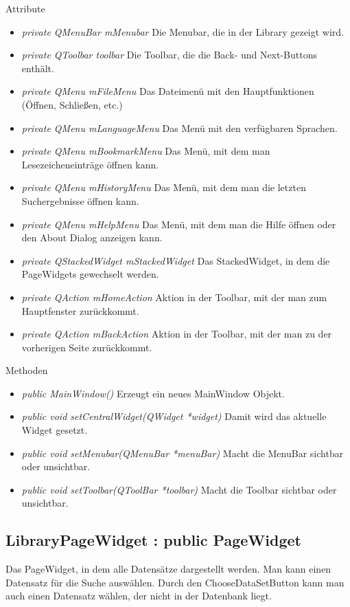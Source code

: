 Attribute
\begin{itemize}
	\item\textit{private QMenuBar mMenubar}
	Die Menubar, die in der Library gezeigt wird.   
	\item\textit{private QToolbar toolbar}
	Die Toolbar, die die Back- und Next-Buttons enthält.
	\item\textit{private QMenu mFileMenu}
	Das Dateimenü mit den Hauptfunktionen (Öffnen, Schließen, etc.)
	\item\textit{private QMenu mLanguageMenu}
	Das Menü mit den verfügbaren Sprachen.
	\item\textit{private QMenu mBookmarkMenu}
	Das Menü, mit dem man Lesezeicheneinträge öffnen kann.
	\item\textit{private QMenu mHistoryMenu}
	Das Menü, mit dem man die letzten Suchergebnisse öffnen kann.
	\item\textit{private QMenu mHelpMenu}
	Das Menü, mit dem man die Hilfe öffnen oder den About Dialog anzeigen kann.
	\item\textit{private QStackedWidget mStackedWidget}
	Das StackedWidget, in dem die PageWidgets gewechselt werden.
	\item\textit{private QAction mHomeAction}
	Aktion in der Toolbar, mit der man zum Hauptfenster zurückkommt.
	\item\textit{private QAction mBackAction}
	Aktion in der Toolbar, mit der man zu der vorherigen Seite zurückkommt.
\end{itemize}

Methoden
\begin{itemize}
	\item\textit{public MainWindow()} 
	Erzeugt ein neues MainWindow Objekt.
	\item\textit{public void setCentralWidget(QWidget *widget)} 
	Damit wird das aktuelle Widget gesetzt.
	\item\textit{public void setMenubar(QMenuBar *menuBar)} 
	Macht die MenuBar sichtbar oder unsichtbar.
	\item\textit{public void setToolbar(QToolBar *toolbar)} 
	Macht die Toolbar sichtbar oder unsichtbar.
\end{itemize}

\subsection*{LibraryPageWidget : public PageWidget}
Das PageWidget, in dem alle Datensätze dargestellt werden. Man kann einen Datensatz für die Suche auswählen. Durch den ChooseDataSetButton kann man auch einen Datensatz wählen, der nicht in der Datenbank liegt. 

